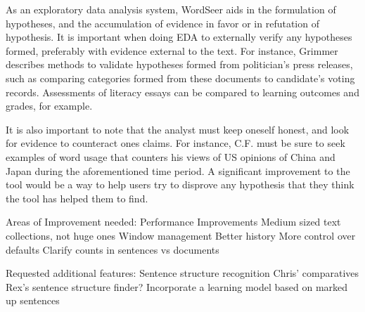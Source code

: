 As an exploratory data analysis system, WordSeer aids in the formulation of hypotheses, and the accumulation of evidence in favor or in refutation of hypothesis.  It is important when doing EDA to externally verify any hypotheses formed, preferably with evidence external to the text.  For instance, Grimmer \cite{grimmer} describes methods to validate hypotheses formed from politician's press releases, such as comparing categories formed from these documents to candidate's voting records.  Assessments of literacy essays can be compared to learning outcomes and grades, for example.  

It is also important to note that the analyst must keep oneself honest, and look for evidence to counteract ones claims.  For instance, C.F. must be sure to seek examples of word usage that counters his views of US opinions of China and Japan during the aforementioned time period.  A significant improvement to the tool would be a way to help users try to disprove any hypothesis that they think the tool has helped them to find.


Areas of Improvement needed:
	Performance Improvements
	Medium sized text collections, not huge ones
	Window management
	Better history
	More control over defaults
	Clarify counts in sentences vs documents
	
Requested additional features:
	Sentence structure recognition
		Chris' comparatives
		Rex's sentence structure finder?
	Incorporate a learning model based on marked up sentences
	
